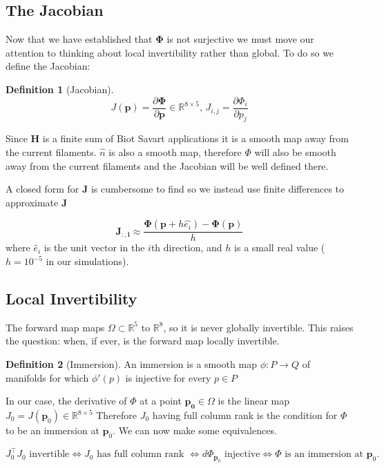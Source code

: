 \documentclass[12pt,a4paper]{report}
\theoremstyle{definition}
\newtheorem{definition}{Definition}[section]
\begin{document}
\subsection{The Jacobian}
Now that we have established that $\mathbf{\Phi}$ is not surjective we must move our attention to thinking about local invertibility rather than global. To do so we define the Jacobian:
\begin{definition}[Jacobian]
 $$ J(\mathbf{p}) = \frac{\partial \mathbf{\Phi}}{\partial \mathbf{p}} \in \mathbb{R}^{8\times5} \text{, } J_{i,j} = \frac{\partial \Phi_i}{\partial p_j} $$
\end{definition}
Since $\mathbf{H}$ is a finite sum of Biot Savart applications it is a smooth map away from the current filaments. $\hat{n}$ is also a smooth map, therefore $\Phi$ will also be smooth away from the current filaments and the Jacobian will be well defined there.

A closed form for $\mathbf{J}$ is cumbersome to find so we instead use finite differences to approximate $\mathbf{J}$

\begin{equation}
  \mathbf{J_{:,i}} \approx \frac{\mathbf{\Phi}\left(\mathbf{p} + h  \hat{e_i} \right) - \mathbf{\Phi(\mathbf{p})}}{h}
\end{equation}
where $\hat{e}_i$ is the unit vector in the $i$th direction, and $h$ is a small real value ($h = 10^{-5}$ in our simulations).

\subsection{Local Invertibility}
The forward map maps $\Omega \subset \mathbb{R}^5$ to $\mathbb{R}^8$, so it is never globally invertible. This raises the question: when, if ever, is the forward map locally invertible. 

\begin{definition}[Immersion]
  An immersion is a smooth map $\phi : P \rightarrow Q$ of manifolds for which $\phi'(p)$ is injective for every $p \in P$
\end{definition}

In our case, the derivative of $\Phi$ at a point $\mathbf{p_0} \in \Omega$ is the linear map $J_0 = J(\mathbf{p}_0) \in \mathbb{R}^{8 \times 5}$ Therefore $J_0$ having full column rank is the condition for $\Phi$ to be an immersion at $\mathbf{p}_0$. We can now make some equivalences.

$$
  J_0^\top J_0 \text{ invertible}
  \iff J_0 \text{ has full column rank }
  \iff d\Phi_{\mathbf{p}_0} \text{ injective}
  \iff \Phi \text{ is an immersion at } \mathbf{p}_0.
$$
\end{document}

